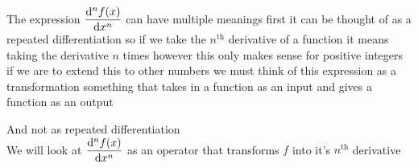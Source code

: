 The expression $\displaystyle \dv[n]{f(x)}{x}$ can have multiple 
meanings first it can be thought of as a repeated differentiation 
so if we take the $ n^{\text{th}} $ derivative of a function it means taking 
the derivative $n$ times however this only makes sense for 
positive integers if we are to extend this to other numbers 
we must think of this expression as a transformation 
something that takes in a function as an input and gives a 
function as an output 

\begin{center}
\end{center}

And not as repeated differentiation 
\\
We will look at $\displaystyle \dv[n]{f(x)}{x}$ as an operator that transforms $f$ into it's $ n^{\text{th}} $ derivative


